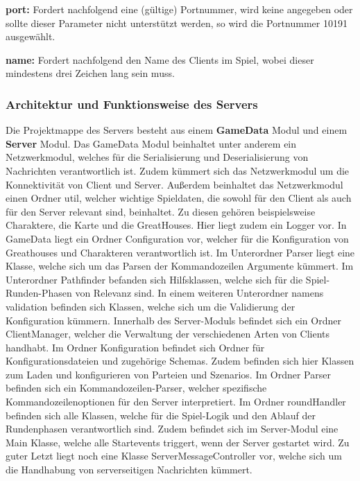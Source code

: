 \documentclass[12pt]{article}
\begin{document}
\textbf{port:} Fordert nachfolgend eine (gültige) Portnummer, wird keine angegeben oder sollte dieser Parameter
nicht unterstützt werden, so wird die Portnummer 10191 ausgewählt.

\textbf{name:} Fordert nachfolgend den Name des Clients im Spiel, wobei dieser mindestens drei Zeichen lang
sein muss.

\subsubsection{Architektur und Funktionsweise des Servers}
Die Projektmappe des Servers besteht aus einem \textbf{GameData} Modul und einem \textbf{Server} Modul. Das GameData Modul beinhaltet unter anderem ein Netzwerkmodul, welches für die Serialisierung und Deserialisierung von Nachrichten verantwortlich ist. Zudem kümmert sich das Netzwerkmodul um die Konnektivität von Client und Server. Außerdem beinhaltet das Netzwerkmodul einen Ordner util, welcher wichtige Spieldaten, die sowohl für den Client als auch für den Server relevant sind, beinhaltet. Zu diesen gehören beispielsweise Charaktere, die Karte und die GreatHouses. Hier liegt zudem ein Logger vor. In GameData liegt ein Ordner Configuration vor, welcher für die Konfiguration von Greathouses und Charakteren verantwortlich ist. Im Unterordner Parser liegt eine Klasse, welche sich um das Parsen der Kommandozeilen Argumente kümmert. Im Unterordner Pathfinder befanden sich Hilfsklassen, welche sich für die Spiel-Runden-Phasen von Relevanz sind. In einem weiteren Unterordner namens validation befinden sich Klassen, welche sich um die Validierung der Konfiguration kümmern. Innerhalb des Server-Moduls befindet sich ein Ordner ClientManager, welcher die Verwaltung der verschiedenen Arten von Clients handhabt. Im Ordner Konfiguration befindet sich Ordner für Konfigurationsdateien und zugehörige Schemas. Zudem befinden sich hier Klassen zum Laden und konfigurieren von Parteien und Szenarios. Im Ordner Parser befinden sich ein Kommandozeilen-Parser, welcher spezifische Kommandozeilenoptionen für den Server interpretiert. Im Ordner roundHandler befinden sich alle Klassen, welche für die Spiel-Logik und den Ablauf der Rundenphasen verantwortlich sind. Zudem befindet sich im Server-Modul eine Main Klasse, welche alle Startevents triggert, wenn der Server gestartet wird. Zu guter Letzt liegt noch eine Klasse ServerMessageController vor, welche sich um die Handhabung von serverseitigen Nachrichten kümmert.
\end{document}
